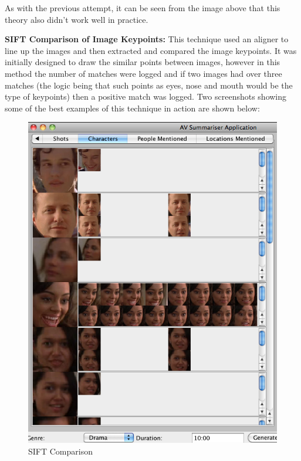 As with the previous attempt, it can be seen from the image above that this theory also didn't work well in practice. 

\newpage
\textbf{SIFT Comparison of Image Keypoints:} This technique used an aligner to line up the images and then extracted and compared the image 
keypoints. It was initially designed to draw the similar points between images, however in this method the number of matches were logged and if 
two images had over three matches (the logic being that such points as eyes, nose and mouth would be the type of keypoints) then a positive match was logged. Two 
screenshots showing some of the best examples of this technique in action are shown below:

\begin{figure}[h1]
\begin{minipage}[b]{0.5\linewidth}
 \includegraphics[trim = 0mm 0mm 0mm 0mm, clip,
 scale=0.38]{Images/SIFT.png}
  \caption{SIFT Comparison}
\end{minipage}
\hspace{0.5cm}

\end{figure}
